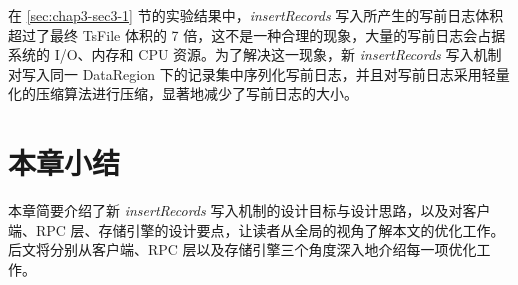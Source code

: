 在 \ref{sec:chap3-sec3-1} 节的实验结果中，\emph{insertRecords} 写入所产生的写前日志体积超过了最终 TsFile 体积的 7 倍，这不是一种合理的现象，大量的写前日志会占据系统的 I/O、内存和 CPU 资源。为了解决这一现象，新 \emph{insertRecords} 写入机制对写入同一 DataRegion 下的记录集中序列化写前日志，并且对写前日志采用轻量化的压缩算法进行压缩，显著地减少了写前日志的大小。

\section{本章小结}
本章简要介绍了新 \emph{insertRecords} 写入机制的设计目标与设计思路，以及对客户端、RPC 层、存储引擎的设计要点，让读者从全局的视角了解本文的优化工作。后文将分别从客户端、RPC 层以及存储引擎三个角度深入地介绍每一项优化工作。